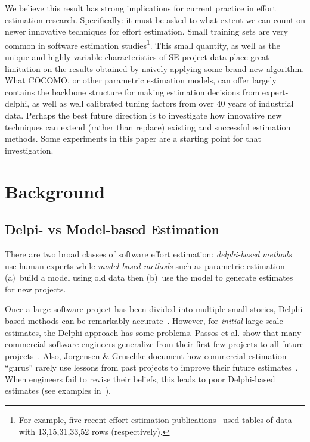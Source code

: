 \documentclass{sig-alternate}
\begin{document}
We believe this result has strong implications for current practice
in effort estimation research. 
Specifically: it must be asked to what extent we
can count on newer innovative techniques for effort estimation.  
Small training sets are very common in software estimation studies\footnote{
For example, five recent  effort estimation
publications~\cite{Mendes2003,Auer2006,baker07,koc11a,Li2009} used tables of data with
13,15,31,33,52 rows (respectively).}.
This small quantity,
 as well as the unique and highly variable characteristics of SE
project data place great limitation on the results
obtained by naively applying some brand-new
algorithm.  What COCOMO, or other parametric
estimation models, can offer largely contains the
backbone structure for making estimation decisions
from expert-delphi, as well as well calibrated
tuning factors from over 40 years of
industrial data. Perhaps the best future direction is to
investigate how innovative new techniques can extend
(rather than replace) existing and successful
estimation methods.  Some experiments in this paper
are a starting point for that investigation.


\section{Background}

\subsection{Delpi- vs Model-based Estimation}

There are two broad classes of software effort
estimation: {\em delphi-based methods}  use
human experts while {\em model-based  methods} such as parametric estimation
(a)~build a model using old data then (b)~use the
model to generate estimates for new projects. 

Once a
large software project has been divided into
multiple small stories, Delphi-based methods can be
remarkably accurate~\cite{molokk08}. However, for {\em initial} large-scale
estimates, the Delphi approach has some problems.
Passos et al. show that many
commercial software engineers generalize from their
first few projects to all future
projects~\cite{passos11}.
Also, Jorgensen \& Gruschke document how
  commercial estimation ``gurus'' rarely use lessons
  from past projects to improve their future estimates~\cite{jorgensen09}. 
When engineers
  fail to revise their beliefs, this leads to poor
  Delphi-based estimates  (see examples in~\cite{jorgensen09}).
\end{document}

